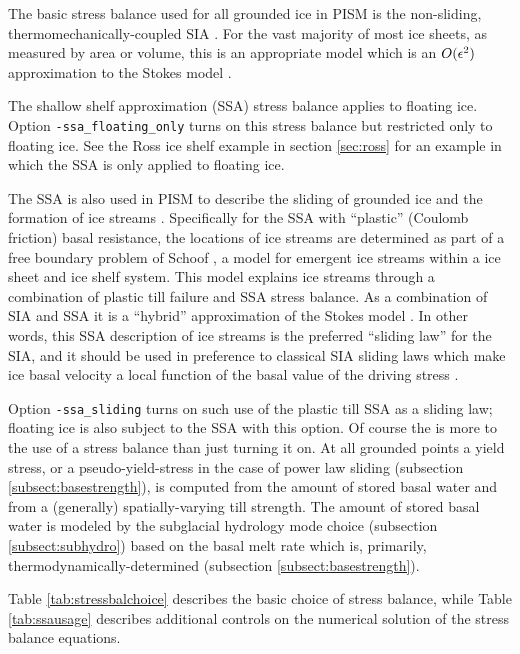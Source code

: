 The basic stress balance used for all grounded ice in PISM is the non-sliding, thermomechanically-coupled SIA \cite{BBL}.  For the vast majority of most ice sheets, as measured by area or volume, this is an appropriate model which is an $O(\epsilon^2)$ approximation to the Stokes model \cite{Fowler}.

The shallow shelf approximation (SSA) stress balance applies to floating ice.  Option \texttt{-ssa_floating_only} turns on this stress balance but restricted only to floating ice.  See the Ross ice shelf example in section \ref{sec:ross} for an example in which the SSA is only applied to floating ice.

The SSA is also used in PISM to describe the sliding of grounded ice and the formation of ice streams \cite{BBssasliding}.  Specifically for the SSA with ``plastic'' (Coulomb friction) basal resistance, the locations of ice streams are determined as part of a free boundary problem of Schoof \cite{SchoofStream}, a model for emergent ice streams within a ice sheet and ice shelf system.  This model explains ice streams through a combination of plastic till failure and SSA stress balance.  As a combination of SIA and SSA it is a ``hybrid'' approximation of the Stokes model \cite{BBssasliding,Winkelmannetal2011}.  In other words, this SSA description of ice streams is the preferred ``sliding law'' for the SIA, and it should be used in preference to classical SIA sliding laws which make ice basal velocity a local function of the basal value of the driving stress \cite{BBssasliding}.

Option \texttt{-ssa_sliding} turns on such use of the plastic till SSA as a sliding law; floating ice is also subject to the SSA with this option.  Of course the is more to the use of a stress balance than just turning it on.  At all grounded points a yield stress, or a pseudo-yield-stress in the case of power law sliding (subsection \ref{subsect:basestrength}), is computed from the amount of stored basal water and from a (generally) spatially-varying till strength.  The amount of stored basal water is modeled by the subglacial hydrology mode choice (subsection \ref{subsect:subhydro}) based on the basal melt rate which is, primarily, thermodynamically-determined (subsection \ref{subsect:basestrength}).

Table \ref{tab:stressbalchoice} describes the basic choice of stress balance, while Table \ref{tab:ssausage} describes additional controls on the numerical solution of the stress balance equations.


